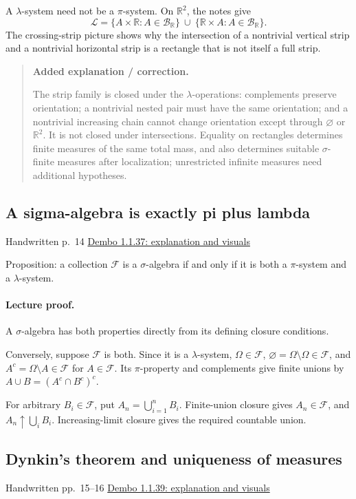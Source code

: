 \documentclass[11pt,letterpaper]{article}
\newcommand{\lecturesection}[1]{\subsection{#1}}
\begin{document}
A $\lambda$-system need not be a $\pi$-system. On $\mathbb R^2$, the notes give \[\mathcal L=\{A\times\mathbb R:A\in\mathcal B_{\mathbb R}\}\ \cup\ \{\mathbb R\times A:A\in\mathcal B_{\mathbb R}\}.\] The crossing-strip picture shows why the intersection of a nontrivial vertical strip and a nontrivial horizontal strip is a rectangle that is not itself a full strip.

\begin{quote}\small\textbf{Added explanation / correction.}

The strip family is closed under the $\lambda$-operations: complements preserve orientation; a nontrivial nested pair must have the same orientation; and a nontrivial increasing chain cannot change orientation except through $\varnothing$ or $\mathbb R^2$. It is not closed under intersections. Equality on rectangles determines finite measures of the same total mass, and also determines suitable $\sigma$-finite measures after localization; unrestricted infinite measures need additional hypotheses.
\end{quote}

\hypertarget{l2-s4}{}
\lecturesection{A sigma-algebra is exactly pi plus lambda}
{\small\textcolor{lectureink}{Handwritten p.\ 14} \quad \href{https://josephrbailey.com/probability/\#entry-1-1-37}{Dembo 1.1.37: explanation and visuals}}

Proposition: a collection $\mathcal F$ is a $\sigma$-algebra if and only if it is both a $\pi$-system and a $\lambda$-system.

\paragraph{Lecture proof.}
A $\sigma$-algebra has both properties directly from its defining closure conditions.

Conversely, suppose $\mathcal F$ is both. Since it is a $\lambda$-system, $\Omega\in\mathcal F$, $\varnothing=\Omega\setminus\Omega\in\mathcal F$, and $A^c=\Omega\setminus A\in\mathcal F$ for $A\in\mathcal F$. Its $\pi$-property and complements give finite unions by $A\cup B=(A^c\cap B^c)^c$.

For arbitrary $B_i\in\mathcal F$, put $A_n=\bigcup_{i=1}^{n}B_i$. Finite-union closure gives $A_n\in\mathcal F$, and $A_n\uparrow\bigcup_iB_i$. Increasing-limit closure gives the required countable union.

\hypertarget{l2-s5}{}
\lecturesection{Dynkin's theorem and uniqueness of measures}
{\small\textcolor{lectureink}{Handwritten pp.\ 15--16} \quad \href{https://josephrbailey.com/probability/\#entry-1-1-39}{Dembo 1.1.39: explanation and visuals}}
\end{document}
